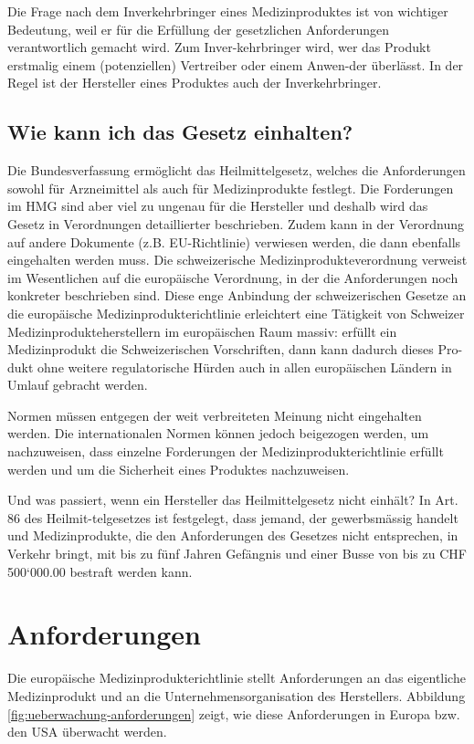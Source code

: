 Die Frage nach dem Inverkehrbringer eines Medizinproduktes ist von wichtiger Bedeutung, weil er für die Erfüllung der gesetzlichen Anforderungen verantwortlich gemacht wird. Zum Inver-kehrbringer wird, wer das Produkt erstmalig einem (potenziellen) Vertreiber oder einem Anwen-der überlässt. In der Regel ist der Hersteller eines Produktes auch der Inverkehrbringer.

\subsection{Wie kann ich das Gesetz einhalten?}

Die Bundesverfassung ermöglicht das Heilmittelgesetz, welches die Anforderungen sowohl für Arzneimittel als auch für Medizinprodukte festlegt. Die Forderungen im HMG sind aber viel zu ungenau für die Hersteller und deshalb wird das Gesetz in Verordnungen detaillierter beschrieben. Zudem kann in der Verordnung auf andere Dokumente (z.B. EU-Richtlinie) verwiesen werden, die dann ebenfalls eingehalten werden muss. Die schweizerische Medizinprodukteverordnung verweist im Wesentlichen auf die europäische Verordnung, in der die Anforderungen noch konkreter beschrieben sind. Diese enge Anbindung der schweizerischen Gesetze an die europäische Medizinprodukterichtlinie erleichtert eine Tätigkeit von Schweizer Medizinprodukteherstellern im europäischen Raum massiv: erfüllt ein Medizinprodukt die Schweizerischen Vorschriften, dann kann dadurch dieses Pro-dukt ohne weitere regulatorische Hürden auch in allen europäischen Ländern in Umlauf gebracht werden.

Normen müssen entgegen der weit verbreiteten Meinung nicht eingehalten werden. Die internationalen Normen können jedoch beigezogen werden, um nachzuweisen, dass einzelne Forderungen der Medizinprodukterichtlinie erfüllt werden und um die Sicherheit eines Produktes nachzuweisen.

Und was passiert, wenn ein Hersteller das Heilmittelgesetz nicht einhält? In Art. 86 des Heilmit-telgesetzes ist festgelegt, dass jemand, der gewerbsmässig handelt und Medizinprodukte, die den Anforderungen des Gesetzes nicht entsprechen, in Verkehr bringt, mit bis zu fünf Jahren Gefängnis und einer Busse von bis zu CHF 500‘000.00 bestraft werden kann.

\section{Anforderungen}

Die europäische Medizinprodukterichtlinie stellt Anforderungen an das eigentliche Medizinprodukt und an die Unternehmensorganisation des Herstellers. Abbildung \ref{fig:ueberwachung-anforderungen} zeigt, wie diese Anforderungen in Europa bzw. den USA überwacht werden.

